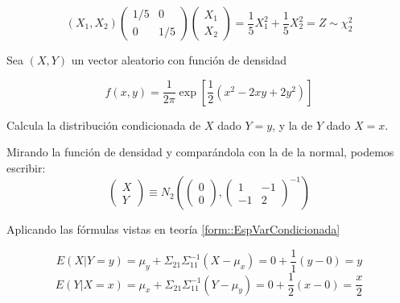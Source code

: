 \begin{problem}[4]
\[
(X_1,X_2)\begin{pmatrix}1/5&0\\0&1/5\end{pmatrix}\begin{pmatrix}X_1\\X_2\end{pmatrix} = \frac{1}{5}X_1^2 + \frac{1}{5}X_2^2 = Z\sim \chi^2_2
\]



\end{problem}

\begin{problem}[5]

Sea $(X, Y )$ un vector aleatorio con función de densidad

\[
f (x, y) = \frac{1}{2π}\exp\left[\frac{1}{2}\left(x^2 − 2xy + 2y^2\right)\right]
\]

\ppart Calcula la distribución condicionada de $X$ dado $Y = y$, y la de $Y$ dado $X = x$.

\solution

Mirando la función de densidad y comparándola con la de la normal, podemos escribir:
\[
\begin{pmatrix}X\\Y \end{pmatrix} \equiv N_2\left(\begin{pmatrix}0\\0\end{pmatrix},\begin{pmatrix}1&-1\\-1&2\end{pmatrix}^{-1}\right)
\]

Aplicando las fórmulas vistas en teoría \ref{form::EspVarCondicionada}

\[
E(X|Y=y) = μ_y + Σ_{21}Σ_{11}^{-1}(X-μ_x) = 0 + \frac{1}{1}(y-0) = y
\]
\[
E(Y|X=x) = μ_x + Σ_{21}Σ_{11}^{-1}(Y-μ_y) = 0 + \frac{1}{2}(x-0) = \frac{x}{2}
\]

\end{problem}

